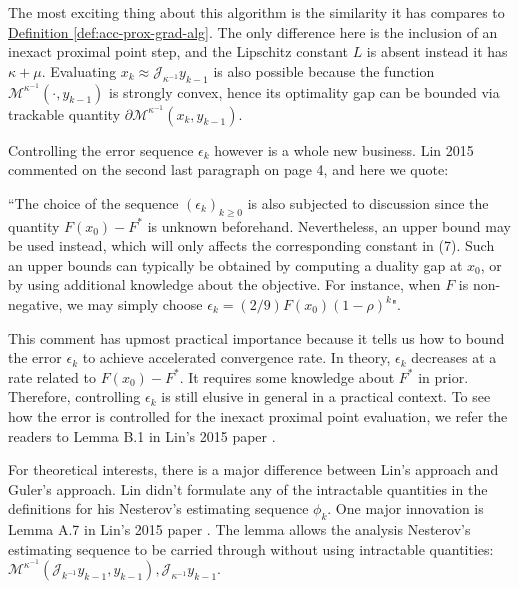 \documentclass[12pt]{article}
\begin{document}
    \begin{remark}
        The most exciting thing about this algorithm is the similarity it has compares to 
        \hyperref[def:acc-prox-grad-alg]{Definition \ref*{def:acc-prox-grad-alg}}. 
        The only difference here is the inclusion of an inexact proximal point step, and the Lipschitz constant $L$ is absent instead it has $\kappa + \mu$. 
        Evaluating $x_k \approx \mathcal J_{\kappa^{-1}}y_{k - 1}$ is also possible because the function $\mathcal M^{\kappa^{-1}}(\cdot, y_{k - 1})$ is strongly convex, hence its optimality gap can be bounded via trackable quantity $\partial \mathcal M^{\kappa^{-1}}(x_k, y_{k - 1})$. 

        Controlling the error sequence $\epsilon_k$ however is a whole new business. 
        Lin 2015 \cite{lin_universal_2015} commented on the second last paragraph on page 4, and here we quote:
        \par
        ``The choice of the sequence $(\epsilon_k)_{k \ge 0}$ is also subjected to discussion since the quantity $F(x_0) - F^*$ is unknown beforehand. Nevertheless, an upper bound may be used instead, which will only affects the corresponding constant in (7). Such an upper bounds can typically be obtained by computing a duality gap at $x_0$, or by using additional knowledge about the objective. For instance, when $F$ is non-negative, we may simply choose $\epsilon_k = (2/9)F(x_0)(1 - \rho)^k$". 
        
        This comment has upmost practical importance because it tells us how to bound the error $\epsilon_k$ to achieve accelerated convergence rate. 
        In theory, $\epsilon_k$ decreases at a rate related to $F(x_0) - F^*$. 
        It requires some knowledge about $F^*$ in prior. 
        Therefore, controlling $\epsilon_k$ is still elusive in general in a practical context. 
        To see how the error is controlled for the inexact proximal point evaluation, we refer the readers to Lemma B.1 in Lin's 2015 paper \cite{lin_universal_2015}. 
    \end{remark}
    For theoretical interests, there is a major difference between Lin's approach and Guler's approach. 
    Lin didn't formulate any of the intractable quantities in the definitions for his Nesterov's estimating sequence $\phi_k$. 
    One major innovation is Lemma A.7 in Lin's 2015 paper \cite{lin_universal_2015}. 
    The lemma allows the analysis Nesterov's estimating sequence to be carried through without using intractable quantities: $\mathcal M^{\kappa^{-1}}(\mathcal J_{k^{-1}}y_{k - 1}, y_{k - 1}), \mathcal J_{\kappa^{-1}}y_{k - 1}$. 
    
\end{document}
